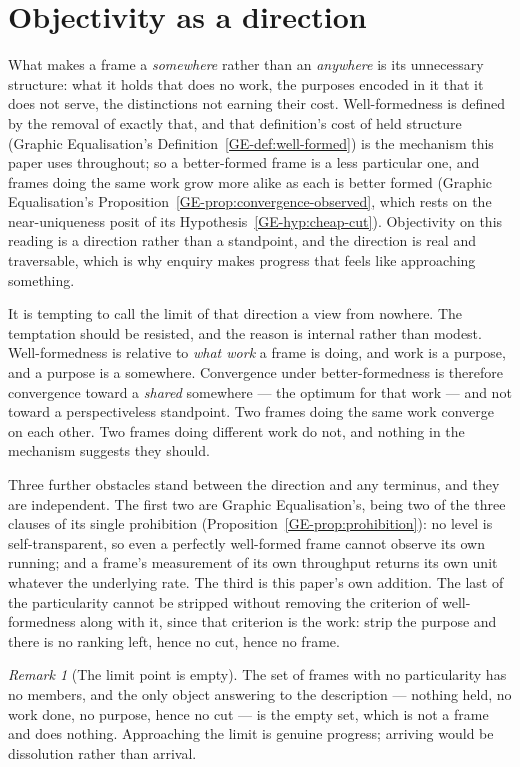 \documentclass[11pt,a4paper]{article}
\theoremstyle{remark}\newtheorem{remark}[definition]{Remark}
\begin{document}
\section{Objectivity as a direction}\label{sec:direction}

What makes a frame a \emph{somewhere} rather than an \emph{anywhere} is its unnecessary structure:
what it holds that does no work, the purposes encoded in it that it does not serve, the distinctions
not earning their cost. Well-formedness is defined by the removal of exactly that, and that
definition's cost of held structure (Graphic Equalisation's Definition~\ref{GE-def:well-formed}) is
the mechanism this paper uses throughout; so a better-formed frame is a less particular one, and
frames doing the same work grow more alike as each is better formed (Graphic Equalisation's
Proposition~\ref{GE-prop:convergence-observed}, which rests on the near-uniqueness posit of its
Hypothesis~\ref{GE-hyp:cheap-cut}). Objectivity on this reading is a direction rather than a standpoint, and the direction is
real and traversable, which is why enquiry makes progress that feels like approaching something.

It is tempting to call the limit of that direction a view from nowhere. The temptation should be resisted, and the reason is internal rather
than modest. Well-formedness is relative to \emph{what work} a frame is doing, and work is a purpose,
and a purpose is a somewhere. Convergence under better-formedness is therefore convergence toward a
\emph{shared} somewhere --- the optimum for that work --- and not toward a perspectiveless standpoint.
Two frames doing the same work converge on each other. Two frames doing different work do not, and
nothing in the mechanism suggests they should.

Three further obstacles stand between the direction and any terminus, and they are independent. The
first two are Graphic Equalisation's, being two of the three clauses of its single prohibition
(Proposition~\ref{GE-prop:prohibition}): no level is self-transparent, so even a perfectly
well-formed frame cannot observe its own running; and a frame's measurement of its own throughput
returns its own unit whatever the underlying rate. The third is this paper's own addition. The
last of the particularity cannot be stripped without removing the criterion of well-formedness along
with it, since that criterion is the work: strip the purpose and there is no ranking left, hence no
cut, hence no frame.

\begin{remark}[The limit point is empty]\label{rem:empty-limit}
The set of frames with no particularity has no members, and the only object answering to the
description --- nothing held, no work done, no purpose, hence no cut --- is the empty set, which is
not a frame and does nothing. Approaching the limit is genuine progress; arriving would be
dissolution rather than arrival.
\end{remark}
\end{document}

